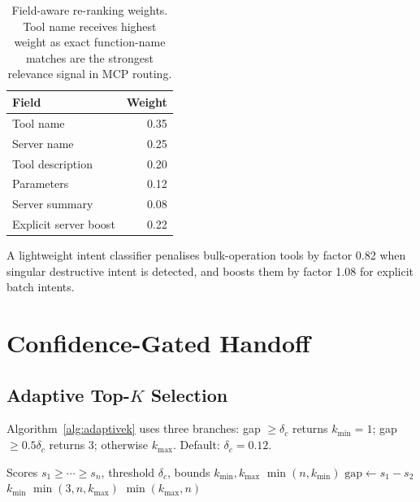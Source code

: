 \documentclass[sigconf,anonymous,review]{acmart}
\begin{document}
\begin{table}[t]
\centering
\caption{Field-aware re-ranking weights. Tool name receives highest weight as exact
function-name matches are the strongest relevance signal in MCP routing.}
\label{tab:field_weights}
\begin{tabular}{@{}lr@{}}
\toprule
Field & Weight \\
\midrule
Tool name             & 0.35 \\
Server name           & 0.25 \\
Tool description      & 0.20 \\
Parameters            & 0.12 \\
Server summary        & 0.08 \\
Explicit server boost & 0.22 \\
\bottomrule
\end{tabular}
\end{table}

A lightweight intent classifier penalises bulk-operation tools by factor 0.82 when
singular destructive intent is detected, and boosts them by factor 1.08 for
explicit batch intents.

\section{Confidence-Gated Handoff}

\subsection{Adaptive Top-\texorpdfstring{$K$}{K} Selection}
Algorithm~\ref{alg:adaptivek} uses three branches: gap $\ge \delta_c$ returns
$k_{\min}=1$; gap $\ge 0.5\delta_c$ returns 3; otherwise $k_{\max}$.
Default: $\delta_c=0.12$.

\begin{algorithm}[t]
\caption{Adaptive Top-$K$ Selection}
\label{alg:adaptivek}
\begin{algorithmic}[1]
\Require Scores $s_1\ge\cdots\ge s_n$, threshold $\delta_c$, bounds $k_{\min},k_{\max}$
 \State \Return $\min(n,k_{\min})$ \EndIf
\State $\mathrm{gap}\gets s_1-s_2$
 \State \Return $k_{\min}$
 \State \Return $\min(3,n,k_{\max})$
\Else \State \Return $\min(k_{\max},n)$
\EndIf
\end{algorithmic}
\end{algorithm}
\end{document}
